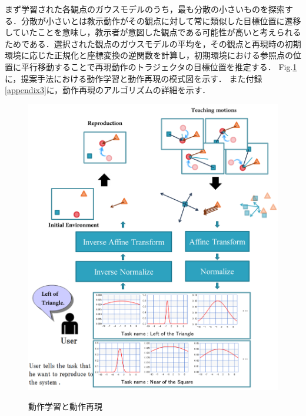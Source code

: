 まず学習された各観点のガウスモデルのうち，最も分散の小さいものを探索する．分散が小さいとは教示動作がその観点に対して常に類似した目標位置に遷移していたことを意味し，教示者が意図した観点である可能性が高いと考えられるためである．選択された観点のガウスモデルの平均を，その観点と再現時の初期環境に応じた正規化と座標変換の逆関数を計算し，初期環境における参照点の位置に平行移動することで再現動作のトラジェクタの目標位置を推定する．
Fig.\ref{figure:learning_and_reproduction_model}に，提案手法における動作学習と動作再現の模式図を示す．
また付録\ref{appendix3}に，動作再現のアルゴリズムの詳細を示す．
	\begin{figure}[h]
		\begin{center}
			\includegraphics[width=12cm]{chart9.png} \\ %
			\caption{動作学習と動作再現}
			\label{figure:learning_and_reproduction_model}
		\end{center}
	\end{figure}

